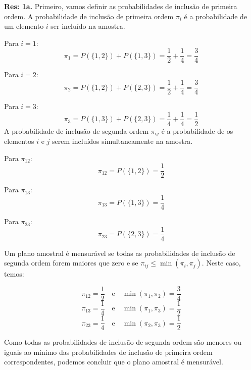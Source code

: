 \documentclass[a4paper,12pt,oneside,twocolumn]{Config/milktest}
\begin{document}
{\scriptsize
\noindent \textbf{Res: 1a.} Primeiro, vamos definir as probabilidades de inclusão de primeira ordem. A probabilidade de inclusão de primeira ordem \(\pi_i\) é a probabilidade de um elemento \(i\) ser incluído na amostra. 

Para \(i = 1\):
\[
\pi_1 = P(\{1, 2\}) + P(\{1, 3\}) = \frac{1}{2} + \frac{1}{4} = \frac{3}{4}
\]

Para \(i = 2\):
\[
\pi_2 = P(\{1, 2\}) + P(\{2, 3\}) = \frac{1}{2} + \frac{1}{4} = \frac{3}{4}
\]

Para \(i = 3\):
\[
\pi_3 = P(\{1, 3\}) + P(\{2, 3\}) = \frac{1}{4} + \frac{1}{4} = \frac{1}{2}
\] 
A probabilidade de inclusão de segunda ordem \(\pi_{ij}\) é a probabilidade de os elementos \(i\) e \(j\) serem incluídos simultaneamente na amostra.

Para \(\pi_{12}\):
\[
\pi_{12} = P(\{1, 2\}) = \frac{1}{2}
\]

Para \(\pi_{13}\):
\[
\pi_{13} = P(\{1, 3\}) = \frac{1}{4}
\]

Para \(\pi_{23}\):
\[
\pi_{23} = P(\{2, 3\}) = \frac{1}{4}
\]

Um plano amostral é mensurável se todas as probabilidades de inclusão de segunda ordem forem maiores que zero e se \(\pi_{ij} \leq \min(\pi_i, \pi_j)\). Neste caso, temos:

\[
\pi_{12} = \frac{1}{2} \quad \text{e} \quad \min(\pi_1, \pi_2) = \frac{3}{4}
\]
\[
\pi_{13} = \frac{1}{4} \quad \text{e} \quad \min(\pi_1, \pi_3) = \frac{1}{2}
\]
\[
\pi_{23} = \frac{1}{4} \quad \text{e} \quad \min(\pi_2, \pi_3) = \frac{1}{2}
\]

Como todas as probabilidades de inclusão de segunda ordem são menores ou iguais ao mínimo das probabilidades de inclusão de primeira ordem correspondentes, podemos concluir que o plano amostral é mensurável.
}
\end{document}
